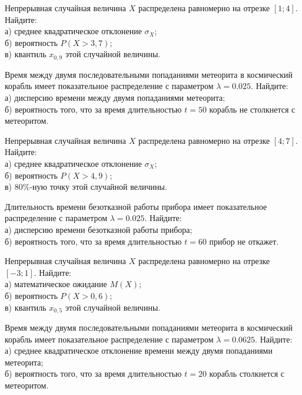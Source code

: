 \vfill

\newpage\setcounter{zad}{0}

\z Непрерывная случайная величина $X$ распределена равномерно на отрезке $[1; 4]$. Найдите: \\ \quad а) среднее квадратическое отклонение $\sigma_X$; \\ \quad б) вероятность $P(X>3{,}7)$; \\ \quad в) квантиль $x_{0{,}9}$ этой случайной величины.


\vfill

\z Время между двумя последовательными попаданиями метеорита в космический корабль имеет показательное распределение с параметром $\lambda = 0.025$. Найдите: \\ \quad а) дисперсию времени между двумя попаданиями метеорита; \\ \quad б) вероятность того, что за время длительностью $t = 50$ корабль не столкнется с метеоритом.
 

\vfill

\newpage\setcounter{zad}{0}

\z Непрерывная случайная величина $X$ распределена равномерно на отрезке $[4; 7]$. Найдите: \\ \quad а) среднее квадратическое отклонение $\sigma_X$; \\ \quad б) вероятность $P(X>4{,}9)$; \\ \quad в) $80\%$-ную точку этой случайной величины.


\vfill

\z Длительность времени безотказной работы прибора имеет показательное распределение с параметром $\lambda = 0.025$. Найдите: \\ \quad а) дисперсию времени безотказной работы прибора; \\ \quad б) вероятность того, что за время длительностью $t = 60$ прибор не откажет.
 

\vfill

\newpage\setcounter{zad}{0}

\z Непрерывная случайная величина $X$ распределена равномерно на отрезке $[-3; 1]$. Найдите: \\ \quad а) математическое ожидание $M(X)$; \\ \quad б) вероятность $P(X>0{,}6)$; \\ \quad в) квантиль $x_{0{,}5}$ этой случайной величины.


\vfill

\z Время между двумя последовательными попаданиями метеорита в космический корабль имеет показательное распределение с параметром $\lambda = 0.0625$. Найдите: \\ \quad а) среднее квадратическое отклонение времени между двумя попаданиями метеорита; \\ \quad б) вероятность того, что за время длительностью $t = 20$ корабль  столкнется с метеоритом.
 


